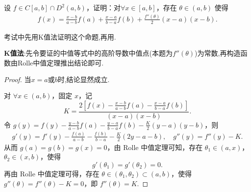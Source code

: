 \documentclass[../../main.tex]{subfiles}%
\begin{document}
\begin{proposition}[Lagrange插值公式]\label{proposition:Lagrange插值公式}
设 $f \in C[a, b] \cap D^2(a, b)$，证明：对$\forall x \in [a, b]$，存在 $\theta \in (a, b)$ 使得
\begin{align*}
f(x) = \frac{x - b}{a - b} f(a) + \frac{x - a}{b - a} f(b) + \frac{f''(\theta)}{2} (x - a)(x - b).
\end{align*}
\end{proposition}
\begin{remark}
考试中先用K值法证明这个命题,再用.
\end{remark}
\begin{note}
\textbf{K值法}:先令要证的中值等式中的高阶导数中值点(本题为$f''(\theta)$)为常数,再构造函数由Rolle中值定理推出结论即可.
\end{note}
\begin{proof}
当$x=a$或$b$时,结论显然成立.

对 $\forall x\in (a,b)$，固定 $x$，记
\[
K=\frac{2\left[ f(x) -\frac{x-b}{a-b}f(a) -\frac{x-a}{b-a}f(b) \right]}{\left( x-a \right) \left( x-b \right)}.
\]
令 $g(y) =f(y) -\frac{y-b}{a-b}f(a) -\frac{y-a}{b-a}f(b) -\frac{K}{2}\left( y-a \right) \left( y-b \right)$，则
\begin{align*}
g'(y) = f'(y) -\frac{f(a)}{a-b}-\frac{f(b)}{b-a}-\frac{K}{2}\left( 2y-a-b \right),\quad 
g''(y) = f''(y) -K.
\end{align*}
从而 $g(a) = g(b) = g(x) = 0$，由 Rolle 中值定理可知，存在 $\theta_1 \in (a,x)$，$\theta_2 \in (x,b)$，使得
\[
g'(\theta_1) = g'(\theta_2) = 0.
\]
再由 Rolle 中值定理可得，存在 $\theta \in (\theta_1, \theta_2) \subset (a,b)$，使得 $g''(\theta) = f''(\theta) - K = 0$，即 $f''(\theta) = K$.
\end{proof}
\end{document}
